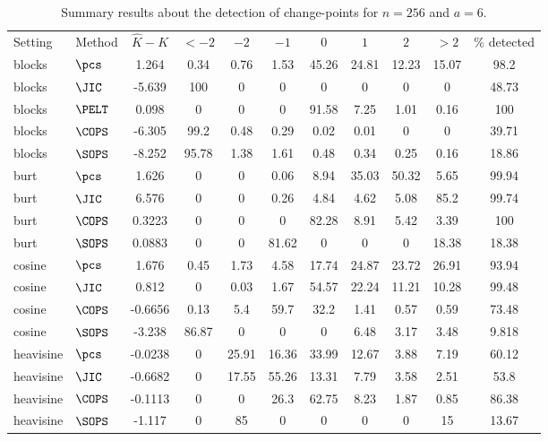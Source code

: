 \begin{table}[ht]
\centering
\begin{tabular}{llccccccccc}
 Setting & Method & $\hat{K} - K$ & $< -2$ & $-2$ & $-1$ & $0$ & $1$ & $2$ & $> 2$ & \% detected \\ 
 blocks & $\pcs$ & 1.264 &  0.34 &  0.76 &  1.53 & 45.26 & 24.81 & 12.23 & 15.07 &  98.2 \\ 
  blocks & $\JIC$ & -5.639 &   100 &     0 &     0 &     0 &     0 &     0 &     0 & 48.73 \\ 
  blocks & $\PELT$ & 0.098 &     0 &     0 &     0 & 91.58 &  7.25 &  1.01 &  0.16 &   100 \\ 
  blocks & $\COPS$ & -6.305 &  99.2 &  0.48 &  0.29 &  0.02 &  0.01 &     0 &     0 & 39.71 \\ 
  blocks & $\SOPS$ & -8.252 & 95.78 &  1.38 &  1.61 &  0.48 &  0.34 &  0.25 &  0.16 & 18.86 \\ 
   \hline
burt & $\pcs$ & 1.626 &     0 &     0 &  0.06 &  8.94 & 35.03 & 50.32 &  5.65 & 99.94 \\ 
  burt & $\JIC$ & 6.576 &     0 &     0 &  0.26 &  4.84 &  4.62 &  5.08 &  85.2 & 99.74 \\ 
  burt & $\COPS$ & 0.3223 &     0 &     0 &     0 & 82.28 &  8.91 &  5.42 &  3.39 &   100 \\ 
  burt & $\SOPS$ & 0.0883 &     0 &     0 & 81.62 &     0 &     0 &     0 & 18.38 & 18.38 \\ 
  cosine & $\pcs$ & 1.676 &  0.45 &  1.73 &  4.58 & 17.74 & 24.87 & 23.72 & 26.91 & 93.94 \\ 
   \hline
cosine & $\JIC$ & 0.812 &     0 &  0.03 &  1.67 & 54.57 & 22.24 & 11.21 & 10.28 & 99.48 \\ 
  cosine & $\COPS$ & -0.6656 &  0.13 &   5.4 &  59.7 &  32.2 &  1.41 &  0.57 &  0.59 & 73.48 \\ 
  cosine & $\SOPS$ & -3.238 & 86.87 &     0 &     0 &     0 &  6.48 &  3.17 &  3.48 & 9.818 \\ 
  heavisine & $\pcs$ & -0.0238 &     0 & 25.91 & 16.36 & 33.99 & 12.67 &  3.88 &  7.19 & 60.12 \\ 
  heavisine & $\JIC$ & -0.6682 &     0 & 17.55 & 55.26 & 13.31 &  7.79 &  3.58 &  2.51 &  53.8 \\ 
   \hline
heavisine & $\COPS$ & -0.1113 &     0 &     0 &  26.3 & 62.75 &  8.23 &  1.87 &  0.85 & 86.38 \\ 
  heavisine & $\SOPS$ & -1.117 &     0 &    85 &     0 &     0 &     0 &     0 &    15 & 13.67 \\ 
  \end{tabular}
\caption{Summary results about the detection of change-points for $n = 256$ and $a = 6$.} 
\label{tab:CPn256a6}
\end{table}
